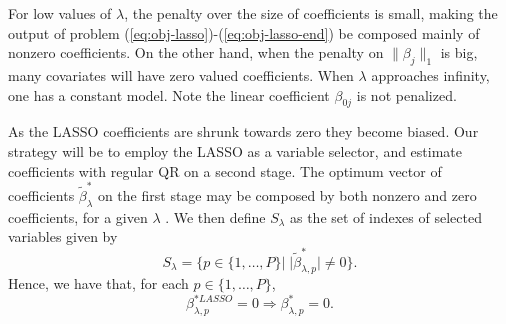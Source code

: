 
For low values of $\lambda$, the penalty over the size of coefficients is small, making the output of problem (\ref{eq:obj-lasso})-(\ref{eq:obj-lasso-end}) be composed mainly of nonzero coefficients. On the other hand, when the penalty on $\| \beta_j \|_1$ is big, many covariates will have zero valued coefficients. When $\lambda$ approaches infinity, one has a constant model. 
Note the linear coefficient $\beta_{0j}$ is not penalized.

As the LASSO coefficients are shrunk towards zero they become biased. Our strategy will be to employ the LASSO as a variable selector, and estimate coefficients with regular QR on a second stage. 
The optimum vector of coefficients $\tilde \beta_\lambda^{*}$ on the first stage may be composed by both nonzero and zero coefficients, for a given $\lambda$ . 
We then define $S_\lambda$ as the set of indexes of selected variables given by
\begin{equation*}
S_\lambda = \{ p \in \{ 1,\dots,P \} | \; |\tilde \beta^{*}_{\lambda,p}| \neq 0  \}.
\end{equation*}
Hence, we have that, for each $p \in \{ 1,\dots,P \}$,
$$\beta^{*LASSO}_{\lambda,p} = 0 \Longrightarrow \beta^{*}_{\lambda,p} = 0.$$

